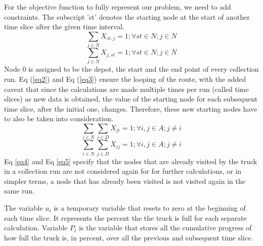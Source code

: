 \documentclass[12pt]{article}
\begin{document}
For the objective function to fully represent our problem, we need to add constraints. The subscript 'st' denotes the starting node at the start of another time slice after the given time interval.
\begin{equation}\label{eq2}
    \sum_{j\in N}X_{st,j}=1 ; \forall st \in N ; j \in N
\end{equation}
\begin{equation}\label{eq3}
    \sum_{j\in N}X_{j,st}=1 ; \forall st \in N ; j \in N
\end{equation}
Node 0 is assigned to be the depot, the start and the end point of every collection run. Eq (\ref{eq2}) and Eq (\ref{eq3}) ensure the looping of the route, with the added caveat that since the calculations are made multiple times per run (called time slices) as new data is obtained, the value of the starting node for each subsequent time slice, after the initial one, changes. Therefore, these new starting nodes have to also be taken into consideration.
\begin{equation}\label{eq4}
    \sum_{i\in N}\sum_{j\in D } X_{ji}=1 ; \forall i,j \in A ; j\ne i
\end{equation}
\begin{equation}\label{eq5}
    \sum_{i\in N}\sum_{j\in D } X_{ij}=1 ; \forall i,j \in A ; j\ne i
\end{equation}
Eq \eqref{eq4} and Eq \eqref{eq5} specify that the nodes that are already visited by the truck in a collection run are not considered again for for further calculations, or in simpler terms, a node that has already been visited is not visited again in the same run.

The variable $u_i$ is a temporary variable that resets to zero at the beginning of each time slice. It represents the percent the the truck is full for each separate calculation. Variable $P_t$ is the variable that stores all the cumulative progress of how full the truck is, in percent, over all the previous and subsequent time slice.
\end{document}
